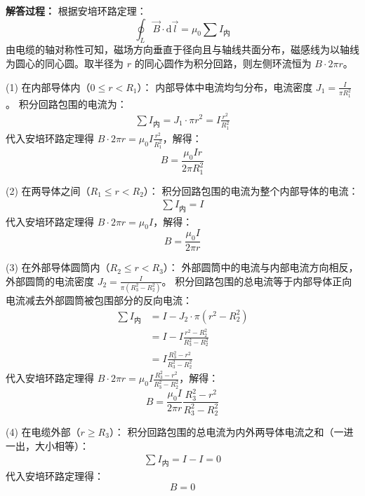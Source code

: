 \textbf{解答过程： }
根据安培环路定理：
\begin{equation}\label{eq:9-16-1}
	\oint_L \vec{B} \cdot \mathrm{d}\vec{l} = \mu_0 \sum I_{\text{内}}
\end{equation}
由电缆的轴对称性可知，磁场方向垂直于径向且与轴线共面分布，磁感线为以轴线为圆心的同心圆。取半径为 $r$ 的同心圆作为积分回路，则左侧环流恒为 $B \cdot 2\pi r$。

(1) 在内部导体内（$0 \le r < R_1$）：
内部导体中电流均匀分布，电流密度 $J_1 = \frac{I}{\pi R_1^2}$。
积分回路包围的电流为：
\begin{align*}
	\sum I_{\text{内}} = J_1 \cdot \pi r^2 = I \frac{r^2}{R_1^2}
\end{align*}
代入安培环路定理得 $B \cdot 2\pi r = \mu_0 I \frac{r^2}{R_1^2}$，解得：
\begin{equation}\label{eq:9-16-2}
	B = \frac{\mu_0 I r}{2\pi R_1^2}
\end{equation}

(2) 在两导体之间（$R_1 \le r < R_2$）：
积分回路包围的电流为整个内部导体的电流：
\begin{align*}
	\sum I_{\text{内}} = I
\end{align*}
代入安培环路定理得 $B \cdot 2\pi r = \mu_0 I$，解得：
\begin{equation}\label{eq:9-16-3}
	B = \frac{\mu_0 I}{2\pi r}
\end{equation}

(3) 在外部导体圆筒内（$R_2 \le r < R_3$）：
外部圆筒中的电流与内部电流方向相反，外部圆筒的电流密度 $J_2 = \frac{I}{\pi (R_3^2 - R_2^2)}$。
积分回路包围的总电流等于内部导体正向电流减去外部圆筒被包围部分的反向电流：
\begin{align*}
	\sum I_{\text{内}} &= I - J_2 \cdot \pi (r^2 - R_2^2) \\
	&= I - I \frac{r^2 - R_2^2}{R_3^2 - R_2^2} \\
	&= I \frac{R_3^2 - r^2}{R_3^2 - R_2^2}
\end{align*}
代入安培环路定理得 $B \cdot 2\pi r = \mu_0 I \frac{R_3^2 - r^2}{R_3^2 - R_2^2}$，解得：
\begin{equation}\label{eq:9-16-4}
	B = \frac{\mu_0 I}{2\pi r} \frac{R_3^2 - r^2}{R_3^2 - R_2^2}
\end{equation}

(4) 在电缆外部（$r \ge R_3$）：
积分回路包围的总电流为内外两导体电流之和（一进一出，大小相等）：
\begin{align*}
	\sum I_{\text{内}} = I - I = 0
\end{align*}
代入安培环路定理得：
\begin{equation}\label{eq:9-16-5}
	B = 0
\end{equation}

